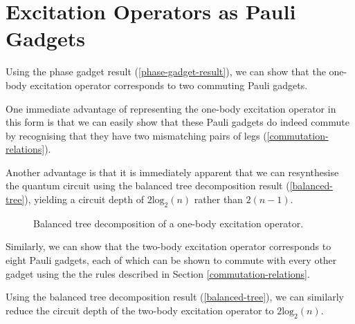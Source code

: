 \section{Excitation Operators as Pauli Gadgets}

Using the phase gadget result (\ref{phase-gadget-result}), we can show that the one-body excitation operator corresponds to two commuting Pauli gadgets.


One immediate advantage of representing the one-body excitation operator in this form is that we can easily show that these Pauli gadgets do indeed commute by recognising that they have two mismatching pairs of legs (\ref{commutation-relations}).

Another advantage is that it is immediately apparent that we can resynthesise the quantum circuit using the balanced tree decomposition result (\ref{balanced-tree}), yielding a circuit depth of $2\text{log}_2(n)$ rather than $2(n-1)$.

\begin{figure}[H]
    \centering
    \caption{Balanced tree decomposition of a one-body excitation operator.}
\end{figure}

Similarly, we can show that the two-body excitation operator corresponds to eight Pauli gadgets, each of which can be shown to commute with every other gadget using the the rules described in Section \ref{commutation-relations}.


Using the balanced tree decomposition result (\ref{balanced-tree}), we can similarly reduce the circuit depth of the two-body excitation operator to $2\text{log}_2(n)$.
